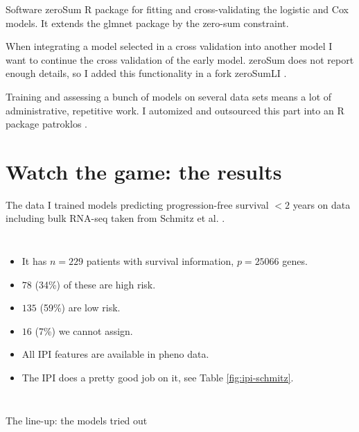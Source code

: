 \documentclass[10pt, aspectratio=169]{beamer}
\begin{document}
\begin{frame}{Software}
  \alert{zeroSum R package} \autocite{zerosumR} for fitting and cross-validating the logistic and Cox models. 
  It extends the glmnet package by the zero-sum constraint.

  \pause
  When integrating a model selected in a cross validation into another model I want to continue the cross 
  validation of the early model. zeroSum does not report enough details, so I added this functionality in 
  a \alert{fork zeroSumLI} \autocite{zerosumliR}.

  \pause
  Training and assessing a bunch of models on several data sets means a lot of administrative, repetitive 
  work. I automized and outsourced this part into an \alert{R package patroklos} \autocite{patroklos}.
\end{frame}

\section{Watch the game: the results}

\begin{frame}{The data}
  I trained models predicting progression-free survival $< 2$ years on data including bulk RNA-seq 
  taken from Schmitz et al. \autocite{schmitz18}. 
  \begin{columns}
      \begin{itemize}
        \item It has $n = \num{229}$ patients with survival information, $p = \num{25066}$ genes.
        \item $\num{78}$ (34\%) of these are high risk.
        \item $\num{135}$ (59\%) are low risk. 
        \item $\num{16}$ (7\%) we cannot assign.
        \item All IPI features are available in pheno data.
        \item The IPI does a pretty good job on it, see Table \ref{fig:ipi-schmitz}.
      \end{itemize}
      
  \end{columns}
\end{frame}

\begin{frame}{The line-up: the models tried out}
  
\end{frame}
\end{document}

